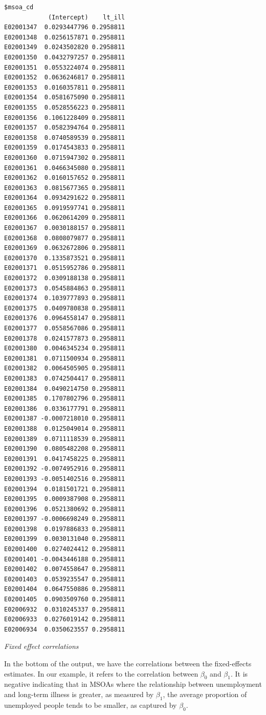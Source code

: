 \documentclass[
  letterpaper,
  DIV=11,
  numbers=noendperiod,
  oneside]{scrreprt}
\begin{document}
\begin{verbatim}
$msoa_cd
            (Intercept)    lt_ill
E02001347  0.0293447796 0.2958811
E02001348  0.0256157871 0.2958811
E02001349  0.0243502820 0.2958811
E02001350  0.0432797257 0.2958811
E02001351  0.0553224074 0.2958811
E02001352  0.0636246817 0.2958811
E02001353  0.0160357811 0.2958811
E02001354  0.0581675090 0.2958811
E02001355  0.0528556223 0.2958811
E02001356  0.1061228409 0.2958811
E02001357  0.0582394764 0.2958811
E02001358  0.0740589539 0.2958811
E02001359  0.0174543833 0.2958811
E02001360  0.0715947302 0.2958811
E02001361  0.0466345080 0.2958811
E02001362  0.0160157652 0.2958811
E02001363  0.0815677365 0.2958811
E02001364  0.0934291622 0.2958811
E02001365  0.0919597741 0.2958811
E02001366  0.0620614209 0.2958811
E02001367  0.0030188157 0.2958811
E02001368  0.0808079877 0.2958811
E02001369  0.0632672806 0.2958811
E02001370  0.1335873521 0.2958811
E02001371  0.0515952786 0.2958811
E02001372  0.0309188138 0.2958811
E02001373  0.0545884863 0.2958811
E02001374  0.1039777893 0.2958811
E02001375  0.0409780838 0.2958811
E02001376  0.0964558147 0.2958811
E02001377  0.0558567086 0.2958811
E02001378  0.0241577873 0.2958811
E02001380  0.0046345234 0.2958811
E02001381  0.0711500934 0.2958811
E02001382  0.0064505905 0.2958811
E02001383  0.0742504417 0.2958811
E02001384  0.0490214750 0.2958811
E02001385  0.1707802796 0.2958811
E02001386  0.0336177791 0.2958811
E02001387 -0.0007218010 0.2958811
E02001388  0.0125049014 0.2958811
E02001389  0.0711118539 0.2958811
E02001390  0.0805482208 0.2958811
E02001391  0.0417458225 0.2958811
E02001392 -0.0074952916 0.2958811
E02001393 -0.0051402516 0.2958811
E02001394  0.0181501721 0.2958811
E02001395  0.0009387908 0.2958811
E02001396  0.0521380692 0.2958811
E02001397 -0.0006698249 0.2958811
E02001398  0.0197886833 0.2958811
E02001399  0.0030131040 0.2958811
E02001400  0.0274024412 0.2958811
E02001401 -0.0043446188 0.2958811
E02001402  0.0074558647 0.2958811
E02001403  0.0539235547 0.2958811
E02001404  0.0647550886 0.2958811
E02001405  0.0903509760 0.2958811
E02006932  0.0310245337 0.2958811
E02006933  0.0276019142 0.2958811
E02006934  0.0350623557 0.2958811
\end{verbatim}

\emph{Fixed effect correlations}

In the bottom of the output, we have the correlations between the
fixed-effects estimates. In our example, it refers to the correlation
between \(\beta_{0}\) and \(\beta_{1}\). It is negative indicating that
in MSOAs where the relationship between unemployment and long-term
illness is greater, as measured by \(\beta_{1}\), the average proportion
of unemployed people tends to be smaller, as captured by \(\beta_{0}\).
\end{document}
